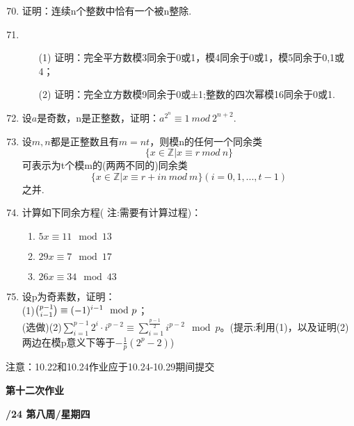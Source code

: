 \documentclass[a4paper,12pt]{article}
\begin{document}
\begin{enumerate}\setcounter{enumi}{69}
    \item 证明：连续n个整数中恰有一个被n整除.
 \item 
 \begin{itemize}
 \item[(1)] 证明：完全平方数模3同余于0或1，模4同余于0或1，模5同余于0,1或4；
 \item[(2)] 证明：完全立方数模9同余于0或±1;整数的四次幂模16同余于0或1.
 \end{itemize}
 \item 设$a$是奇数，n是正整数，证明：$a^{2^n}\equiv 1\ mod\ 2^{n+2}$.
 \item 设$m,n$都是正整数且有$m=nt$，则模n的任何一个同余类
 \begin{equation}
 \{x\in\mathbb{Z}|x\equiv r\ mod\ n\}\nonumber
 \end{equation}
 可表示为t个模m的(两两不同的)同余类
 \begin{equation}
 \{x\in\mathbb{Z}|x\equiv r+in\ mod\ m\}(i=0,1,...,t-1)\nonumber
 \end{equation}
 之并.
 \item 计算如下同余方程({\color{blue} 注:需要有计算过程})：\begin{enumerate}
     \item $5x\equiv 11 \mod 13$
     \item $29x \equiv 7  \mod 17$
     \item $26x \equiv 34 \mod 43$
 \end{enumerate}
 \item 设p为奇素数，证明：\\
    (1)\quad $\tbinom{p-1}{i-1} \equiv (-1)^{i-1} \mod p$；\\
    {\color{red} (选做)}(2)\quad $\sum\limits_{i=1}^{p-1} 2^i\cdot i^{p-2} \equiv \sum\limits_{i=1}^{\frac{p-1}{2}} i^{p-2} \mod p$。({\color{blue}提示:利用(1)，以及证明(2)两边在模p意义下等于$-\frac{1}{p}(2^p-2)$})
\end{enumerate}

{\color{red} 注意：10.22和10.24作业应于10.24-10.29期间提交}
\newpage
\head

\begin{center} %
	{\Large \bf 第十二次作业} %
	\vspace{2mm}
	
	{\bf{}/24 \quad  第八周/星期四} %
\end{center} 
\end{document}
